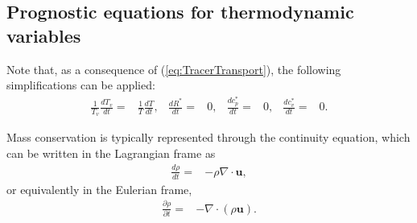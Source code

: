 \documentclass[gmd, manuscript]{copernicus}
\newcommand{\vb}{\mathbf}
\newcommand{\diff}[2]{\frac{d #1}{d #2}}
\newcommand{\pdiff}[2]{\frac{\partial #1}{\partial #2}}
\begin{document}
\subsection{Prognostic equations for thermodynamic variables}

Note that, as a consequence of (\ref{eq:TracerTransport}), the following simplifications can be applied:
\begin{align}
\frac{1}{T_v} \diff{T_v}{t} =& \frac{1}{T} \diff{T}{t}, & \diff{R^\ast}{t} =& 0, & \diff{c_p^\ast}{t} =& 0, & \diff{c_v^\ast}{t} =& 0.
\end{align}

Mass conservation is typically represented through the continuity equation, which can be written in the Lagrangian frame as
\begin{align} \label{eq:ContinuityEquation}
\diff{\rho}{t} =& - \rho \nabla \cdot \vb{u},
\end{align} or equivalently in the Eulerian frame,
\begin{align} \label{eq:EulerianContinuityEquation}
\pdiff{\rho}{t} =& - \nabla \cdot (\rho \vb{u}).
\end{align}
\end{document}
